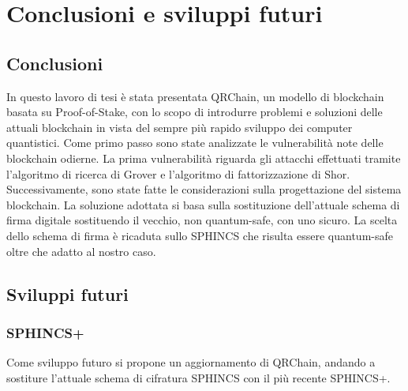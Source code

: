 \chapter{Conclusioni e sviluppi futuri}
\section{Conclusioni}
In questo lavoro di tesi è stata presentata QRChain, un modello di blockchain basata su Proof-of-Stake, con lo scopo di introdurre problemi e soluzioni delle attuali blockchain in vista del sempre più rapido sviluppo dei computer quantistici. Come primo passo sono state analizzate le vulnerabilità note delle blockchain odierne. La prima vulnerabilità riguarda gli attacchi effettuati tramite l'algoritmo di ricerca di Grover e l'algoritmo di fattorizzazione di Shor. Successivamente, sono state fatte le considerazioni sulla progettazione del sistema blockchain. La soluzione adottata si basa sulla sostituzione dell'attuale schema di firma digitale sostituendo il vecchio, non quantum-safe, con uno sicuro. La scelta dello schema di firma è ricaduta sullo SPHINCS che risulta essere quantum-safe oltre che adatto al nostro caso.

\section{Sviluppi futuri}

\subsection{SPHINCS+}
Come sviluppo futuro si propone un aggiornamento di QRChain, andando a sostiture l'attuale schema di cifratura SPHINCS con il più recente SPHINCS+.

